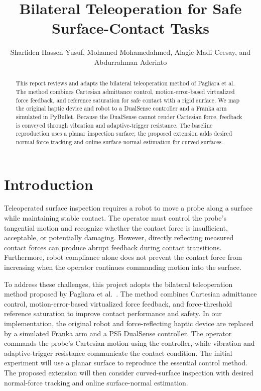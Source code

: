 \documentclass[journal]{IEEEtran}
\begin{document}
\title{Bilateral Teleoperation for Safe Surface-Contact Tasks}
\author{Sharfiden Hassen Yusuf, Mohamed Mohamedahmed, Alagie Madi Ceesay, and Abdurrahman Aderinto}
\maketitle

\begin{abstract}
This report reviews and adapts the bilateral teleoperation method of Pagliara et al. The method combines Cartesian admittance control, motion-error-based virtualized force feedback, and reference saturation for safe contact with a rigid surface. We map the original haptic device and robot to a DualSense controller and a Franka arm simulated in PyBullet. Because the DualSense cannot render Cartesian force, feedback is conveyed through vibration and adaptive-trigger resistance. The baseline reproduction uses a planar inspection surface; the proposed extension adds desired normal-force tracking and online surface-normal estimation for curved surfaces.
\end{abstract}

\section{Introduction}
Teleoperated surface inspection requires a robot to move a probe along a surface while maintaining stable contact. The operator must control the probe's tangential motion and recognize whether the contact force is insufficient, acceptable, or potentially damaging. However, directly reflecting measured contact forces can produce abrupt feedback during contact transitions. Furthermore, robot compliance alone does not prevent the contact force from increasing when the operator continues commanding motion into the surface.

To address these challenges, this project adopts the bilateral teleoperation method proposed by Pagliara et al.\ \cite{pagliara}. The method combines Cartesian admittance control, motion-error-based virtualized force feedback, and force-threshold reference saturation to improve contact performance and safety. In our implementation, the original robot and force-reflecting haptic device are replaced by a simulated Franka arm and a PS5 DualSense controller. The operator commands the probe's Cartesian motion using the controller, while vibration and adaptive-trigger resistance communicate the contact condition. The initial experiment will use a planar surface to reproduce the essential control method. The proposed extension will then consider curved-surface inspection with desired normal-force tracking and online surface-normal estimation.
\end{document}
